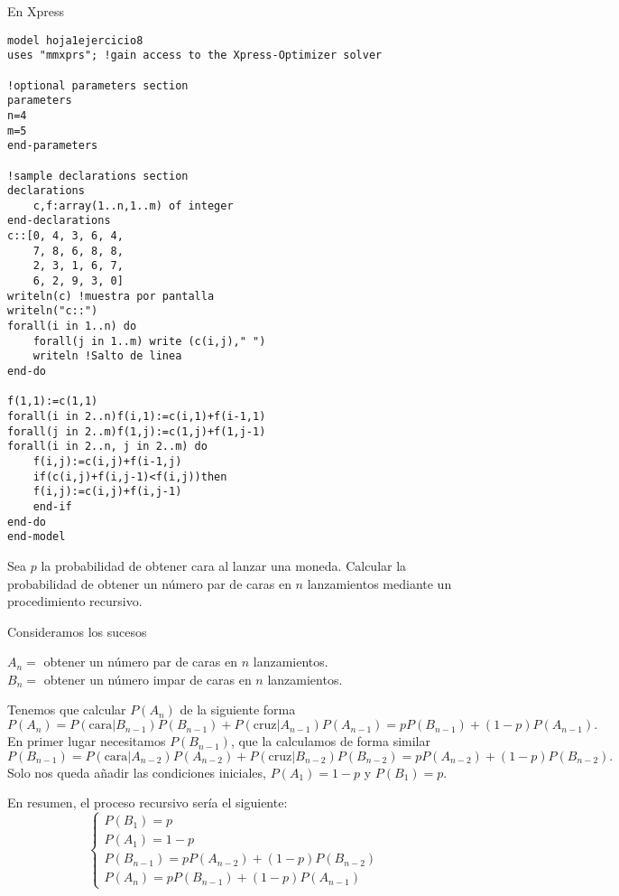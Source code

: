 \documentclass[twoside]{article}
\begin{document}
\begin{solucion}
En Xpress
\begin{verbatim}
model hoja1ejercicio8
uses "mmxprs"; !gain access to the Xpress-Optimizer solver

!optional parameters section
parameters
n=4
m=5
end-parameters

!sample declarations section
declarations
	c,f:array(1..n,1..m) of integer
end-declarations
c::[0, 4, 3, 6, 4,
	7, 8, 6, 8, 8,
	2, 3, 1, 6, 7,
	6, 2, 9, 3, 0]
writeln(c) !muestra por pantalla
writeln("c::")
forall(i in 1..n) do
	forall(j in 1..m) write (c(i,j)," ")
	writeln !Salto de linea
end-do

f(1,1):=c(1,1)
forall(i in 2..n)f(i,1):=c(i,1)+f(i-1,1)
forall(j in 2..m)f(1,j):=c(1,j)+f(1,j-1)
forall(i in 2..n, j in 2..m) do
	f(i,j):=c(i,j)+f(i-1,j)
	if(c(i,j)+f(i,j-1)<f(i,j))then
	f(i,j):=c(i,j)+f(i,j-1)
	end-if
end-do
end-model

\end{verbatim}
\end{solucion}

\newpage

\begin{ejercicio}{9}
Sea $p$ la probabilidad de obtener cara al lanzar una moneda. Calcular la probabilidad de
obtener un número par de caras en $n$ lanzamientos mediante un procedimiento recursivo.
\end{ejercicio}
\begin{solucion}
Consideramos los sucesos 

$A_n=$ obtener un número par de caras en $n$ lanzamientos.\\
$B_n=$ obtener un número impar de caras en $n$ lanzamientos.

Tenemos que calcular $P(A_n)$ de la siguiente forma
$$P(A_n)=P(\text{cara}|B_{n-1})P(B_{n-1})+P(\text{cruz}|A_{n-1})P(A_{n-1})=pP(B_{n-1})+(1-p)P(A_{n-1}).$$
En primer lugar necesitamos $P(B_{n-1})$, que la calculamos de forma similar
$$P(B_{n-1})=P(\text{cara}|A_{n-2})P(A_{n-2})+P(\text{cruz}|B_{n-2})P(B_{n-2})=pP(A_{n-2})+(1-p)P(B_{n-2}).$$
Solo nos queda añadir las condiciones iniciales, $P(A_1)=1-p$ y $P(B_1)=p$. 

En resumen, el proceso recursivo sería el siguiente:
$$\begin{cases}
P(B_1)=p\\
P(A_1)=1-p\\
P(B_{n-1})=pP(A_{n-2})+(1-p)P(B_{n-2})\\
P(A_n)=pP(B_{n-1})+(1-p)P(A_{n-1})
\end{cases}$$
\end{solucion}
\end{document}
